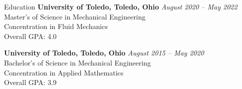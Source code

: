 \documentclass{bilal}
\begin{document}
\begin{rSection}{Education}
{\bf University of Toledo, Toledo, Ohio} \hfill {\em August 2020 -- May 2022} \\
Master's of Science in Mechanical Engineering \\
Concentration in Fluid Mechanics \smallskip \\
Overall GPA: 4.0

{\bf University of Toledo, Toledo, Ohio} \hfill {\em August 2015 -- May 2020} \\
Bachelor's of Science in Mechanical Engineering \\
Concentration in Applied Mathematics \smallskip \\
Overall GPA: 3.9
\end{rSection}
\end{document}

